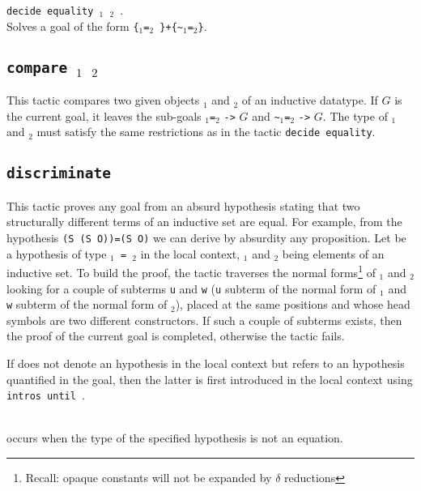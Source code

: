 \begin{Variants}
\item {\tt decide equality {\term}$_1$ {\term}$_2$ }.\\
 Solves a goal of the form {\tt \{}\term$_1${\tt =}\term$_2${\tt
\}+\{\verb|~|}\term$_1${\tt =}\term$_2${\tt \}}.
\end{Variants}

\subsection{\tt compare \term$_1$ \term$_2$}
This tactic compares two given objects \term$_1$ and \term$_2$ 
of an inductive datatype. If $G$ is the current goal, it leaves the sub-goals
\term$_1${\tt =}\term$_2$ {\tt ->} $G$ and \verb|~|\term$_1${\tt =}\term$_2$
{\tt ->} $G$. The type
of \term$_1$ and \term$_2$ must satisfy the same restrictions as in the tactic
\texttt{decide equality}.

\subsection {\tt discriminate {\ident}}
\label{discriminate}
This tactic proves any goal from an absurd
hypothesis stating that two structurally different terms of an
inductive set are equal. For example, from the hypothesis {\tt (S (S
  O))=(S O)} we can derive by absurdity any proposition.  Let {\ident}
be a hypothesis of type {\tt{\term$_1$} = {\term$_2$}} in the local
context, {\term$_1$} and {\term$_2$} being elements of an inductive set.
To build the proof, the tactic traverses the normal
forms\footnote{Recall: opaque constants will not be expanded by
  $\delta$ reductions} of {\term$_1$} and {\term$_2$} looking for a
couple of subterms {\tt u} and {\tt w} ({\tt u} subterm of the normal
form of {\term$_1$} and {\tt w} subterm of the normal form of
{\term$_2$}), placed at the same positions and whose
head symbols are two different constructors. If such a couple of subterms
exists, then the proof of the current goal is completed,
otherwise the tactic fails.

\Rem If {\ident} does not denote an hypothesis in the local context
but refers to an hypothesis quantified in the goal, then the
latter is first introduced in the local context using
\texttt{intros until \ident}.

\begin{ErrMsgs}
\item {\ident}  \\
  occurs when the type of the specified hypothesis is not an equation.
\end{ErrMsgs}  

